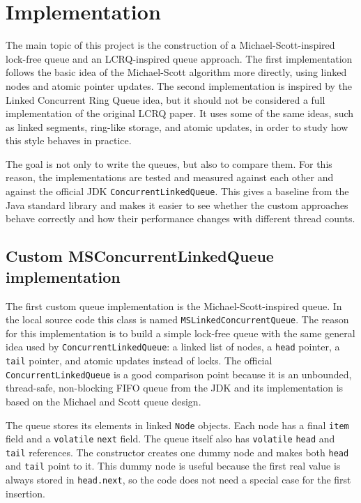 
\section{Implementation}
The main topic of this project is the construction of a Michael-Scott-inspired lock-free queue and an LCRQ-inspired queue approach. The first implementation follows the basic idea of the Michael-Scott algorithm more directly, using linked nodes and atomic pointer updates. The second implementation is inspired by the Linked Concurrent Ring Queue idea, but it should not be considered a full implementation of the original LCRQ paper. It uses some of the same ideas, such as linked segments, ring-like storage, and atomic updates, in order to study how this style behaves in practice.

The goal is not only to write the queues, but also to compare them. For this reason, the implementations are tested and measured against each other and against the official JDK \texttt{ConcurrentLinkedQueue}. This gives a baseline from the Java standard library and makes it easier to see whether the custom approaches behave correctly and how their performance changes with different thread counts.


\subsection{Custom MSConcurrentLinkedQueue implementation}
The first custom queue implementation is the Michael-Scott-inspired queue. In the local source code this class is named \texttt{MSLinkedConcurrentQueue}. The reason for this implementation is to build a simple lock-free queue with the same general idea used by \texttt{ConcurrentLinkedQueue}: a linked list of nodes, a \texttt{head} pointer, a \texttt{tail} pointer, and atomic updates instead of locks. The official \texttt{ConcurrentLinkedQueue} is a good comparison point because it is an unbounded, thread-safe, non-blocking FIFO queue from the JDK and its implementation is based on the Michael and Scott queue design. \cite{clq-docs}

The queue stores its elements in linked \texttt{Node} objects. Each node has a final \texttt{item} field and a \texttt{volatile} \texttt{next} field. The queue itself also has \texttt{volatile} \texttt{head} and \texttt{tail} references. The constructor creates one dummy node and makes both \texttt{head} and \texttt{tail} point to it. This dummy node is useful because the first real value is always stored in \texttt{head.next}, so the code does not need a special case for the first insertion.

